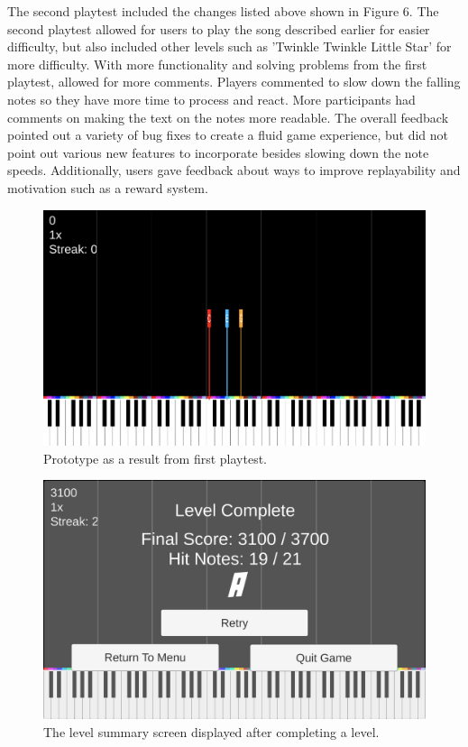 \documentclass[10pt,twocolumn]{article}
\begin{document}
The second playtest included the changes listed above shown in Figure 6. The second playtest allowed for users to play the song described earlier for easier difficulty, but also included other levels such as 'Twinkle Twinkle Little Star' for more difficulty. With more functionality and solving problems from the first playtest, allowed for more comments. Players commented to slow down the falling notes so they have more time to process and react. More participants had comments on making the text on the notes more readable. The overall feedback pointed out a variety of bug fixes to create a fluid game experience, but did not point out various new features to incorporate besides slowing down the note speeds. Additionally, users gave feedback about ways to improve replayability and motivation such as a reward system. 


    

\begin{figure}
    \centering
    \includegraphics[width=.95\linewidth]{pulsekey-proto2.png}
    \caption{
       Prototype as a result from first playtest. 
    }
    \label{fig:first-page}
\end{figure}

\begin{figure}
    \centering
    \includegraphics[width=.95\linewidth]{pulsekey-score.png}
    \caption{
       The level summary screen displayed after completing a level. 
    }
    \label{fig:first-page}
\end{figure}
\end{document}
